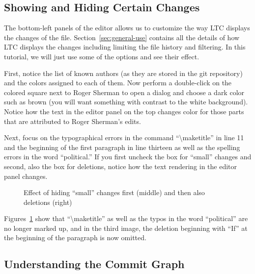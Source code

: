 \subsection{Showing and Hiding Certain Changes}

The bottom-left panels of the editor allows us to customize the way LTC displays the changes of the file.  Section~\ref{sec:general-use} contains all the details of how LTC displays the changes including limiting the file history and filtering.  In this tutorial, we will just use some of the options and see their effect.

First, notice the list of known authors (as they are stored in the git repository) and the colors assigned to each of them.  Now perform a double-click on the colored square next to Roger Sherman to open a dialog and  choose a dark color such as brown (you will want something with contrast to the white background).  Notice how the text in the editor panel on the top changes color for those parts that are attributed to Roger Sherman's edits.

Next, focus on the typographical errors in the command ``\textbackslash maketitle'' in line 11 and the beginning of the first paragraph in line thirteen as well as the spelling errors in the word ``political.''  If you first uncheck the box for ``small'' changes and second, also the box for deletions, notice how the text rendering in the editor panel changes.
\begin{figure}[t]
  \centering
  \hspace{2em}
  \hspace{2em}
\caption{Effect of hiding ``small'' changes first (middle) and then also deletions (right)} \label{fig:editor-filter-small}
\end{figure}
Figures~\ref{fig:editor-filter-small} show that ``\textbackslash maketitle'' as well as the typos in the word ``political'' are no longer marked up, and in the third image, the deletion beginning with ``If'' at the beginning of the paragraph is now omitted.

\subsection{Understanding the Commit Graph}

